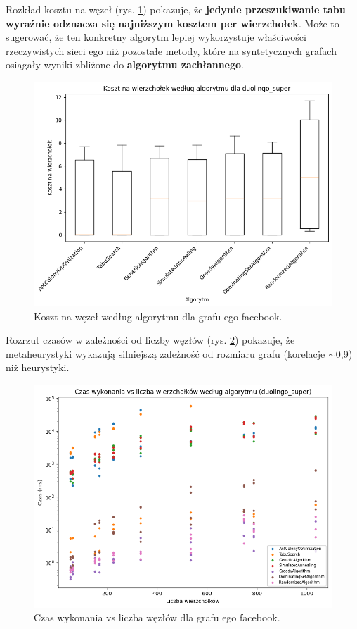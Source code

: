 Rozkład kosztu na węzeł (rys. \ref{fig:facebook_cost_per_node}) pokazuje, że \textbf{jedynie przeszukiwanie tabu wyraźnie odznacza się najniższym kosztem per wierzchołek}. Może to sugerować, że ten konkretny algorytm lepiej wykorzystuje właściwości rzeczywistych sieci ego niż pozostałe metody, które na syntetycznych grafach osiągały wyniki zbliżone do \textbf{algorytmu zachłannego}.

\begin{figure}[H]
  \centering
  \includegraphics[width=0.7\linewidth]{assets/figures/facebook_cost_per_node.png}
  \caption{Koszt na węzeł według algorytmu dla grafu ego facebook.}
  \label{fig:facebook_cost_per_node}
\end{figure}

Rozrzut czasów w zależności od liczby węzłów (rys. \ref{fig:facebook_time_scatter}) pokazuje, że metaheurystyki wykazują silniejszą zależność od rozmiaru grafu (korelacje $\sim$0,9) niż heurystyki.

\begin{figure}[H]
  \centering
  \includegraphics[width=0.7\linewidth]{assets/figures/facebook_time_scatter.png}
  \caption{Czas wykonania vs liczba węzłów dla grafu ego facebook.}
  \label{fig:facebook_time_scatter}
\end{figure}

